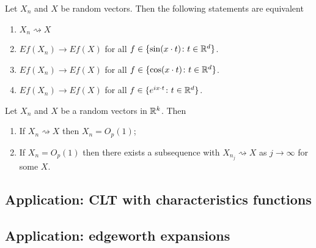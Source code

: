 \begin{theorem}[{\bf Portmanteau IV}]
Let $X_n$ and $X$ be random vectors.
Then the following statements are equivalent
\begin{enumerate}
\item  $X_n\rightsquigarrow X $
\item  $ E f(X_n) \rightarrow E f(X)$ for all $f\in \{\sin(x\cdot t)\colon t\in\Bbb R^d \}$.
\item  $ E f(X_n) \rightarrow E f(X)$ for all $f\in \{\cos(x\cdot t)\colon t\in\Bbb R^d \}$.
\item  $ E f(X_n) \rightarrow E f(X)$ for all $f\in \{e^{i x\cdot t}\colon t\in\Bbb R^d \}$.
\end{enumerate}
\end{theorem}



\begin{theorem}
Let $X_n$ and $X$ be a random vectors in $\Bbb R^k$. Then
\begin{enumerate}
\item If $X_n\rightsquigarrow X$ then $X_n = O_p(1)$;
\item If $X_n = O_p(1)$ then there exists a subsequence with $X_{n_j}\rightsquigarrow X$ as $j\rightarrow \infty$ for some $X$.
\end{enumerate}
\end{theorem}




\subsection{Application: CLT with characteristics functions}

\subsection{Application: edgeworth expansions}










